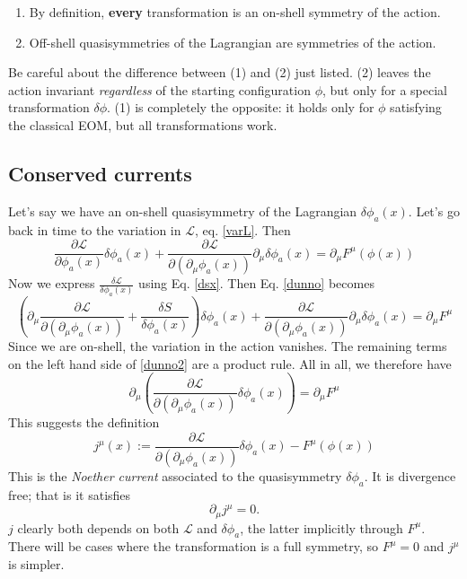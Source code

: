 \documentclass[main.tex]{subfiles}
\begin{document}
\begin{enumerate}
\item By definition, \textbf{every} transformation is an on-shell symmetry of the action. 

\item Off-shell quasisymmetries of the Lagrangian are symmetries of the action.
\end{enumerate}

Be careful about the difference between (1) and (2) just listed.  (2) leaves the action invariant \textit{regardless} of the starting configuration $\phi$, but only for a special transformation $\delta \phi$. (1) is completely the opposite: it holds only for $\phi$ satisfying the classical EOM, but all transformations work.

\subsection{Conserved currents} \label{consc}
Let's say we have an on-shell quasisymmetry of the Lagrangian $\delta \phi_a (x)$. Let's go back in time to the variation in $\mathcal{L}$, eq. \ref{varL}. Then
\begin{equation} \label{dunno}
\frac{\partial \mathcal{L}}{\partial \phi_a (x)} \delta \phi_a (x) + \frac{\partial \mathcal{L}}{\partial (\partial_\mu \phi_a (x))} \partial_\mu \delta \phi_a (x) = \partial_\mu F^\mu (\phi(x))
\end{equation}
Now we express $\frac{\delta \mathcal{L}}{\delta \phi_a (x)}$ using Eq. \ref{dsx}. Then Eq. \ref{dunno} becomes
\begin{equation} \label{dunno2}
\left( 
\partial_\mu \frac{\partial \mathcal{L} }{\partial (\partial_\mu \phi_a (x))} + \frac{\delta S}{\delta \phi_a (x)}
\right) \delta \phi_a (x) + \frac{\partial \mathcal{L}}{\partial (\partial_\mu \phi_a (x))}\partial_\mu \delta \phi_a (x) = \partial_\mu F^\mu
\end{equation}
Since we are on-shell, the variation in the action vanishes. The remaining terms on the left hand side of \ref{dunno2} are a product rule. All in all, we therefore have
\begin{equation} \label{wowj}
\partial_\mu \left(
\frac{\partial \mathcal{L}}{\partial (\partial_\mu \phi_a (x))} \delta \phi_a (x)
\right) = \partial_\mu F^\mu
\end{equation}
This suggests the definition
\begin{equation} \label{noethercurrent}
j^\mu (x) := 
\frac{\partial \mathcal{L}}{\partial (\partial_\mu \phi_a (x))} \delta \phi_a (x)
- F^\mu (\phi(x))
\end{equation}
This is the \textit{Noether current} associated to the quasisymmetry $\delta \phi_a$. It is divergence free; that is it satisfies
\begin{equation}\label{divj}
\partial_\mu j^\mu = 0.
\end{equation}
$j$ clearly both depends on both $\mathcal{L}$ and $\delta \phi_a$, the latter implicitly through $F^\mu$. There will be cases where the transformation is a full symmetry, so $F^\mu = 0$ and $j^\mu$ is simpler. 
\end{document}
